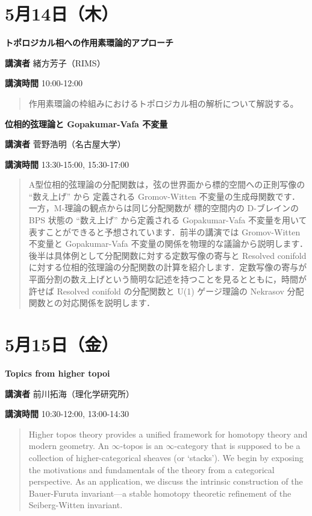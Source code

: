 \documentclass{ltjsarticle}
\theoremstyle{mystyle} %
\numberwithin{equation}{section}
\newcommand{\TBA}{TBA}
\newcommand{\spkB}{緒方芳子}
\newcommand{\spkC}{菅野浩明}
\newcommand{\spkD}{前川拓海}
\newcommand{\instB}{RIMS}
\newcommand{\instC}{名古屋大学}
\newcommand{\instD}{理化学研究所}
\newcommand{\titleB}{トポロジカル相への作用素環論的アプローチ}
\newcommand{\titleC}{位相的弦理論と Gopakumar-Vafa 不変量}
\newcommand{\titleD}{Topics from higher topoi}
\newcommand{\abst}[5]{
    \Large
    \textbf{#1}
    \normalsize
    
    \vspace{10pt}

    \textbf{講演者} #2（#3）

    \textbf{講演時間} #4

    \vspace{5pt}

    \begin{quote}
        #5
    \end{quote}

    \vspace{10pt}
}
\begin{document}
\newpage

\section*{5月14日（木）}

\abst{\titleB}{\spkB}{\instB}{10:00-12:00}{
    作用素環論の枠組みにおけるトポロジカル相の解析について解説する。
}

\abst{\titleC}{\spkC}{\instC}{13:30-15:00, 15:30-17:00}{
    A型位相的弦理論の分配関数は，弦の世界面から標的空間への正則写像の “数え上げ” から
    定義される Gromov-Witten 不変量の生成母関数です．一方，M-理論の観点からは同じ分配関数が
    標的空間内の D-ブレインの BPS 状態の “数え上げ” から定義される Gopakumar-Vafa 不変量を用いて
    表すことができると予想されています．前半の講演では Gromov-Witten 不変量と Gopakumar-Vafa 
    不変量の関係を物理的な議論から説明します．後半は具体例として分配関数に対する定数写像の寄与と
    Resolved conifold に対する位相的弦理論の分配関数の計算を紹介します．定数写像の寄与が
    平面分割の数え上げという簡明な記述を持つことを見るとともに，時間が許せば
    Resolved conifold の分配関数と U(1) ゲージ理論の Nekrasov 分配関数との対応関係を説明します．
}

\newpage

\section*{5月15日（金）}

\abst{\titleD}{\spkD}{\instD}{10:30-12:00, 13:00-14:30}{
    Higher topos theory provides a unified framework for homotopy theory and modern geometry. An $\infty$-topos is an $\infty$-category that is supposed to be a collection of higher-categorical sheaves (or `stacks'). We begin by exposing the motivations and fundamentals of the theory from a categorical perspective. As an application, we discuss the intrinsic construction of the Bauer-Furuta invariant---a stable homotopy theoretic refinement of the Seiberg-Witten invariant.
}
\end{document}
